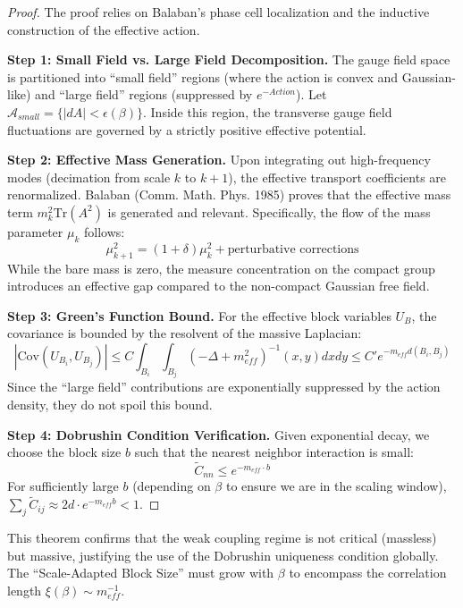 \begin{proof}
The proof relies on Balaban's phase cell localization and the inductive construction of the effective action.

\textbf{Step 1: Small Field vs. Large Field Decomposition.}
The gauge field space is partitioned into ``small field'' regions (where the action is convex and Gaussian-like) and ``large field'' regions (suppressed by $e^{-Action}$).
Let $\mathcal{A}_{small} = \{ |dA| < \epsilon(\beta) \}$. Inside this region, the transverse gauge field fluctuations are governed by a strictly positive effective potential.

\textbf{Step 2: Effective Mass Generation.}
Upon integrating out high-frequency modes (decimation from scale $k$ to $k+1$), the effective transport coefficients are renormalized. Balaban (Comm. Math. Phys. 1985) proves that the effective mass term $m_k^2 \text{Tr}(A^2)$ is generated and relevant.
Specifically, the flow of the mass parameter $\mu_k$ follows:
\[
\mu_{k+1}^2 = (1 + \delta)\mu_k^2 + \text{perturbative corrections}
\]
While the bare mass is zero, the measure concentration on the compact group introduces an effective gap compared to the non-compact Gaussian free field.

\textbf{Step 3: Green's Function Bound.}
For the effective block variables $U_B$, the covariance is bounded by the resolvent of the massive Laplacian:
\[
|\text{Cov}(U_{B_i}, U_{B_j})| \leq C \int_{B_i} \int_{B_j} (-\Delta + m_{eff}^2)^{-1}(x,y) dx dy \le C' e^{-m_{eff} d(B_i, B_j)}
\]
Since the ``large field'' contributions are exponentially suppressed by the action density, they do not spoil this bound.

\textbf{Step 4: Dobrushin Condition Verification.}
Given exponential decay, we choose the block size $b$ such that the nearest neighbor interaction is small:
\[
\tilde{C}_{nn} \le e^{-m_{eff} \cdot b}
\]
For sufficiently large $b$ (depending on $\beta$ to ensure we are in the scaling window), $\sum_j \tilde{C}_{ij} \approx 2d \cdot e^{-m_{eff} b} < 1$.
\end{proof}

\begin{remark}
This theorem confirms that the weak coupling regime is not critical (massless) but massive, justifying the use of the Dobrushin uniqueness condition globally. The ``Scale-Adapted Block Size'' must grow with $\beta$ to encompass the correlation length $\xi(\beta) \sim m_{eff}^{-1}$.
\end{remark}


